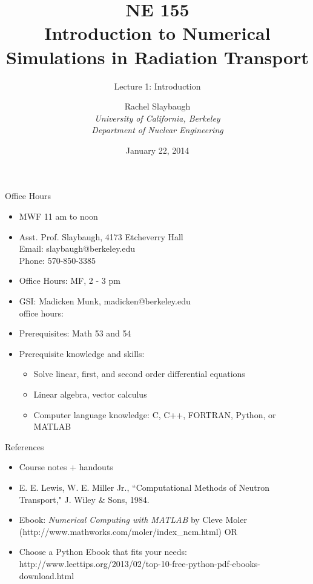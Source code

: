 \documentclass[xcolor=x11names,compress]{beamer}
\renewcommand{\(}{\begin{columns}}
\renewcommand{\)}{\end{columns}}
\newcommand{\<}[1]{\begin{column}{#1}}
\renewcommand{\>}{\end{column}}
\begin{document}
\begin{frame}
\title{NE 155\\Introduction to Numerical Simulations in Radiation Transport}
\subtitle{Lecture 1: Introduction}
\author{
        Rachel Slaybaugh\\
        \vspace*{1em}
        {\it University of California, Berkeley\\
         Department of Nuclear Engineering}\\
}
\date{January 22, 2014}
\titlepage
\end{frame}

\begin{frame}{Office Hours}
\begin{itemize}
\item MWF 11 am to noon
\item Asst. Prof. Slaybaugh, 4173 Etcheverry Hall\\
      Email: slaybaugh@berkeley.edu \\
      Phone: 570-850-3385
\item Office Hours: MF, 2 - 3 pm
\item GSI: Madicken Munk, madicken@berkeley.edu\\
      office hours:
\item Prerequisites: Math 53 and 54
\item Prerequisite knowledge and skills: 
\begin{itemize}
\item Solve linear, first, and second order differential equations
\item Linear algebra, vector calculus
\item Computer language knowledge: C, C++, FORTRAN, Python, or MATLAB	
\end{itemize}
\end{itemize}
\end{frame}

\begin{frame}{References}
\begin{itemize}
\item Course notes + handouts
\item E. E. Lewis, W. E. Miller Jr., ``Computational Methods of Neutron Transport," J. Wiley \& Sons, 1984.
\item Ebook: \emph{Numerical Computing with MATLAB} by Cleve Moler (http://www.mathworks.com/moler/index\_ncm.html) OR
\item Choose a Python Ebook that fits your needs:
http://www.leettips.org/2013/02/top-10-free-python-pdf-ebooks-download.html
\end{itemize}
\end{frame}
\end{document}
